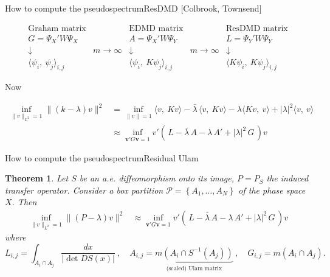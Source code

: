\documentclass[
  english,            %
  aspectratio=169,    %
]{tumbeamer}
\newtheorem{theorem}{Theorem}
\newcommand{\cP}{\mathcal{P}}
\newcommand{\bv}{\mathbf{v}}
\begin{document}
\begin{frame}{How to compute the pseudospectrum}{ResDMD [Colbrook, Townsend]}
  
\begin{equation}
  \begin{matrix}
    \text{Graham matrix} & & \text{EDMD matrix} & & \text{ResDMD matrix} \\ 
    G = \Psi_X ' W \Psi_X &  &A = \Psi_X ' W \Psi_Y & &  L = \Psi_Y ' W \Psi_Y \\ 
    \downarrow & \scriptstyle{m \to \infty} & \downarrow & \scriptstyle{m \to \infty} & \downarrow \\ 
    \langle \psi_i,\ \psi_j \rangle_{i,j} & & \langle \psi_i,\ K\psi_j \rangle_{i,j} & & \langle K \psi_i,\ K \psi_j \rangle_{i,j}
  \end{matrix}
\end{equation}

Now

\begin{align}
  \inf_{\| v \|_{L^2} = 1} \| (k - \lambda) v \|^2 &= \inf_{\| v \| = 1} 
  \langle v,\ K v \rangle - \bar{\lambda} \,\langle v,\ K v \rangle - \lambda \langle K v,\ v \rangle + |\lambda|^2 \langle v,\ v \rangle \\
  &\approx \inf_{\bv' G \bv = 1} v' (\, L - \bar{\lambda}\, A - \lambda\, A' + |\lambda|^2 \,G \,) v
\end{align}

\end{frame}

\begin{frame}{How to compute the pseudospectrum}{Residual Ulam}

\begin{theorem}
  Let $S$ be an a.e. diffeomorphism onto its image, $P = P_S$ the induced transfer operator. Consider a box partition $\cP = \left\{ A_1, \ldots, A_N \right\}$ of the phase space $X$. Then 
  \begin{align}
    \inf_{\| v \|_{L^2} = 1} \| (P - \lambda) v \|^2 &\approx \inf_{\bv' G \bv = 1} v' (\, L - \bar{\lambda}\, A - \lambda\, A' + |\lambda|^2 \,G \,) v
  \end{align}
  where 
  \begin{equation}
    L_{i,j} = \int_{A_i \cap A_j} \frac{dx}{| \det DS (x) |}
    \ , \quad 
    A_{i,j} = \underbrace{m(A_i \cap S^{-1} (A_j))}_{\text{(scaled) Ulam matrix}}
    \ , \quad 
    G_{i,j} = m(A_i \cap A_j) . 
  \end{equation}
\end{theorem}
\end{frame}
\end{document}
